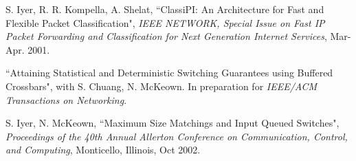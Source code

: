 \documentclass[11pt, a4paper]{article}
\begin{document}
\begin{footnotesize}
\begin{thebibliography}{}
S. Iyer, R. R. Kompella, A. Shelat, ``ClassiPI: An Architecture for Fast and Flexible Packet Classification", {\it IEEE NETWORK, Special Issue on Fast IP Packet Forwarding and Classification
for Next Generation Internet Services}, Mar-Apr. 2001.

``Attaining Statistical and Deterministic Switching Guarantees using Buffered
Crossbars", with S. Chuang, N. McKeown. In preparation for {\it IEEE/ACM Transactions
on Networking}.

S. Iyer, N. McKeown, ``Maximum Size Matchings and Input Queued Switches",
{\it Proceedings of the 40th Annual Allerton Conference on Communication, Control, and
Computing}, Monticello, Illinois, Oct 2002.



\end{thebibliography}
\end{footnotesize}
\end{document}
